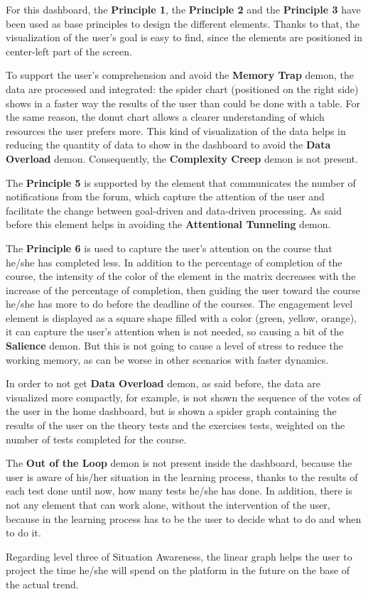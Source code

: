 For this dashboard, the \textbf{Principle 1}, the \textbf{Principle 2} and the \textbf{Principle 3}
have been used as base principles to design the different elements. Thanks to that, the 
visualization of the user's goal is easy to find, since the elements are positioned in center-left
part of the screen. 

To support the user's comprehension and avoid the 
\textbf{Memory Trap} demon, the data are processed and integrated: the spider chart
(positioned on the right side) shows in a faster way the results of the user than
could be done with a table. For the same reason, the donut chart allows a clearer 
understanding of which resources the user prefers more. This kind of visualization of the
data helps in reducing the quantity of data to show in the dashboard to 
avoid the \textbf{Data Overload} demon. Consequently, the \textbf{Complexity Creep} demon is not present.

The \textbf{Principle 5} is supported by the element that communicates the number of 
notifications from the forum, which capture the attention of the user and
facilitate the change between goal-driven and data-driven processing. As said before
this element helps in avoiding the \textbf{Attentional Tunneling} demon.

The \textbf{Principle 6} is used to capture the user's attention on the course that
he/she has completed less. In addition to the percentage of completion of the course,
the intensity of the color of the element in the matrix decreases with the increase
of the percentage of completion, then guiding the user toward the course he/she has more to
do before the deadline of the courses. The engagement level element is displayed as a square
shape filled with a color (green, yellow, orange), it can capture the user's attention when is not needed, so 
causing a bit of the \textbf{Salience} demon. But this is not going to cause a
level of stress to reduce the working memory, as can be worse in other scenarios with 
faster dynamics.

In order to not get \textbf{Data Overload} demon, as said before, the data are visualized
more compactly, for example, is not shown the sequence of the votes of the user in
the home dashboard, but is shown a spider graph containing the results of the user on the
theory tests and the exercises tests, weighted on the number of tests completed for the course.

The \textbf{Out of the Loop} demon is not present inside the dashboard, because
the user is aware of his/her situation in the learning process, thanks to the results of each
test done until now, how many tests he/she has done. In addition, there is not any 
element that can work alone, without the intervention of the user, because in the 
learning process has to be the user to decide what to do and when to do it.

Regarding level three of
Situation Awareness, the linear graph helps the user to project the time he/she will
spend on the platform in the future on the base of the actual trend.